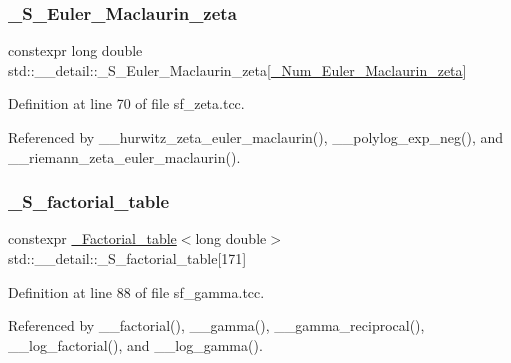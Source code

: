 \subsubsection{\texorpdfstring{\+\_\+\+S\+\_\+\+Euler\+\_\+\+Maclaurin\+\_\+zeta}{\_S\_Euler\_Maclaurin\_zeta}}
{\footnotesize\ttfamily constexpr long double std\+::\+\_\+\+\_\+detail\+::\+\_\+\+S\+\_\+\+Euler\+\_\+\+Maclaurin\+\_\+zeta\mbox{[}\hyperlink{namespacestd_1_1____detail_ab27e687e1052be7a72de187e0dead124}{\+\_\+\+Num\+\_\+\+Euler\+\_\+\+Maclaurin\+\_\+zeta}\mbox{]}}



Definition at line 70 of file sf\+\_\+zeta.\+tcc.



Referenced by \+\_\+\+\_\+hurwitz\+\_\+zeta\+\_\+euler\+\_\+maclaurin(), \+\_\+\+\_\+polylog\+\_\+exp\+\_\+neg(), and \+\_\+\+\_\+riemann\+\_\+zeta\+\_\+euler\+\_\+maclaurin().

\mbox{\label{namespacestd_1_1____detail_a008b54abe31c1027aefdfd7a76a40e99}} 
\subsubsection{\texorpdfstring{\+\_\+\+S\+\_\+factorial\+\_\+table}{\_S\_factorial\_table}}
{\footnotesize\ttfamily constexpr \hyperlink{structstd_1_1____detail_1_1__Factorial__table}{\+\_\+\+Factorial\+\_\+table}$<$long double$>$ std\+::\+\_\+\+\_\+detail\+::\+\_\+\+S\+\_\+factorial\+\_\+table\mbox{[}171\mbox{]}}



Definition at line 88 of file sf\+\_\+gamma.\+tcc.



Referenced by \+\_\+\+\_\+factorial(), \+\_\+\+\_\+gamma(), \+\_\+\+\_\+gamma\+\_\+reciprocal(), \+\_\+\+\_\+log\+\_\+factorial(), and \+\_\+\+\_\+log\+\_\+gamma().

\mbox{\label{namespacestd_1_1____detail_ad2bdb66d93fa4433097b287c7899cd1e}} 

